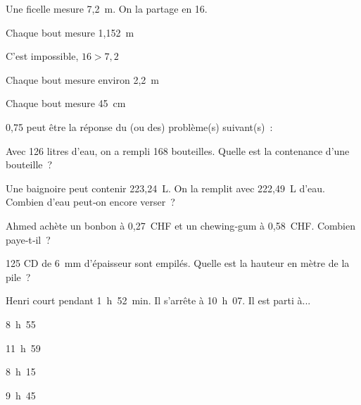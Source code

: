 \begin{QCM}
\begin{GroupeQCM}
    
     \begin{exercice}
      Une ficelle mesure 7,2 m. On la partage en 16.
      \begin{ChoixQCM}{4}
      \item Chaque bout mesure 1,152 m
      \item C'est impossible, $16 > 7,2$
      \item Chaque bout mesure environ 2,2 m
      \item Chaque bout mesure 45 cm
      \end{ChoixQCM}
      \begin{corrige}
   \end{corrige}
    \end{exercice}
    
    \begin{exercice}
      0,75 peut être la réponse du (ou des) problème(s) suivant(s) :
      \begin{ChoixQCM}{4}
      \item Avec 126 litres d'eau, on a rempli 168 bouteilles. Quelle est la contenance d'une bouteille ?
      \item Une baignoire peut contenir 223,24 L. On la remplit avec  222,49 L d'eau. Combien d'eau peut‑on encore verser ?
      \item Ahmed achète un bonbon à 0,27 CHF et un chewing‑gum à 0,58 CHF. Combien paye‑t‑il ?
      \item 125 CD de 6 mm d'épaisseur sont empilés. Quelle est la hauteur en mètre de la pile ?
      \end{ChoixQCM}
      \begin{corrige}
   \end{corrige}
    \end{exercice}
    
    \begin{exercice}
      Henri court pendant 1 h 52 min. Il s'arrête à 10 h 07. Il est parti à...
      \begin{ChoixQCM}{4}
      \item 8 h 55
      \item 11 h 59
      \item 8 h 15
      \item 9 h 45
      \end{ChoixQCM}
      \begin{corrige}
   \end{corrige}
    \end{exercice}

\end{GroupeQCM}
\end{QCM}

  